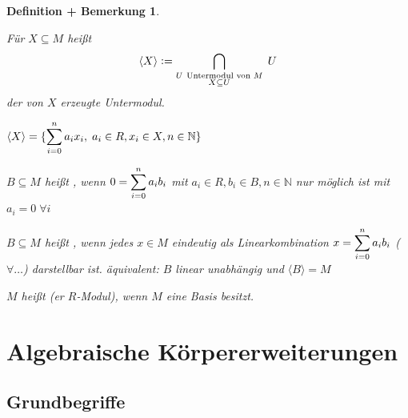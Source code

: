 \documentclass[a4paper,10pt,german]{scrbook}
\theoremstyle{saetze}
\theoremstyle{definitionen}
\newtheorem{DefBem}[Def]{Definition + Bemerkung}
\begin{document}
\begin{DefBem}
\begin{enum}
\item Für $X \subseteq M$ heißt \[\langle X \rangle \mathrel{\mathop:}=
\bigcap_{\substack{U \mbox{ \scriptsize Untermodul von } M \\ X
\subseteq U}}\;U\] der von $X$ erzeugte Untermodul.

\item $\displaystyle \langle X \rangle = \{ \sum_{i=0}^n a_i x_i,\; a_i \in R,
x_i \in X, n \in \mathbb{N}\}$

\item $B \subseteq M$ heißt , wenn $\displaystyle 0 =
\sum_{i=0}^n a_i b_i$ mit $a_i \in R, b_i \in B, n \in \mathbb{N}$
nur möglich ist mit $a_i = 0\;\forall i$

\item $B \subseteq M$ heißt , wenn jedes $x \in M$
eindeutig als Linearkombination $\displaystyle x=\sum_{i=0}^n a_i b_i$
($\forall \dots$) darstellbar ist.
\newline äquivalent: $B$ linear unabhängig und $\langle B \rangle =
M$

\item $M$ heißt (er $R$-Modul), wenn $M$ eine Basis
besitzt.
\end{enum}
\end{DefBem}



\chapter{Algebraische Körpererweiterungen}

\section{Grundbegriffe}
\end{document}
